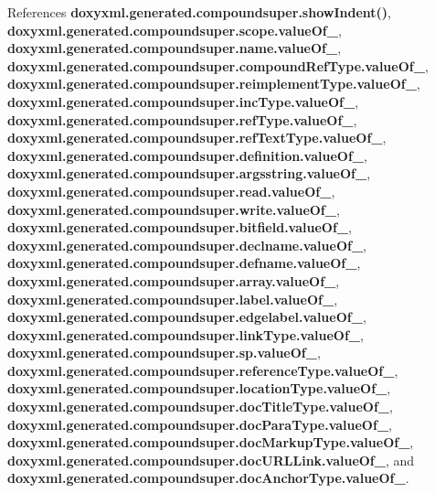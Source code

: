 References {\bf doxyxml.\+generated.\+compoundsuper.\+show\+Indent()}, {\bf doxyxml.\+generated.\+compoundsuper.\+scope.\+value\+Of\+\_\+}, {\bf doxyxml.\+generated.\+compoundsuper.\+name.\+value\+Of\+\_\+}, {\bf doxyxml.\+generated.\+compoundsuper.\+compound\+Ref\+Type.\+value\+Of\+\_\+}, {\bf doxyxml.\+generated.\+compoundsuper.\+reimplement\+Type.\+value\+Of\+\_\+}, {\bf doxyxml.\+generated.\+compoundsuper.\+inc\+Type.\+value\+Of\+\_\+}, {\bf doxyxml.\+generated.\+compoundsuper.\+ref\+Type.\+value\+Of\+\_\+}, {\bf doxyxml.\+generated.\+compoundsuper.\+ref\+Text\+Type.\+value\+Of\+\_\+}, {\bf doxyxml.\+generated.\+compoundsuper.\+definition.\+value\+Of\+\_\+}, {\bf doxyxml.\+generated.\+compoundsuper.\+argsstring.\+value\+Of\+\_\+}, {\bf doxyxml.\+generated.\+compoundsuper.\+read.\+value\+Of\+\_\+}, {\bf doxyxml.\+generated.\+compoundsuper.\+write.\+value\+Of\+\_\+}, {\bf doxyxml.\+generated.\+compoundsuper.\+bitfield.\+value\+Of\+\_\+}, {\bf doxyxml.\+generated.\+compoundsuper.\+declname.\+value\+Of\+\_\+}, {\bf doxyxml.\+generated.\+compoundsuper.\+defname.\+value\+Of\+\_\+}, {\bf doxyxml.\+generated.\+compoundsuper.\+array.\+value\+Of\+\_\+}, {\bf doxyxml.\+generated.\+compoundsuper.\+label.\+value\+Of\+\_\+}, {\bf doxyxml.\+generated.\+compoundsuper.\+edgelabel.\+value\+Of\+\_\+}, {\bf doxyxml.\+generated.\+compoundsuper.\+link\+Type.\+value\+Of\+\_\+}, {\bf doxyxml.\+generated.\+compoundsuper.\+sp.\+value\+Of\+\_\+}, {\bf doxyxml.\+generated.\+compoundsuper.\+reference\+Type.\+value\+Of\+\_\+}, {\bf doxyxml.\+generated.\+compoundsuper.\+location\+Type.\+value\+Of\+\_\+}, {\bf doxyxml.\+generated.\+compoundsuper.\+doc\+Title\+Type.\+value\+Of\+\_\+}, {\bf doxyxml.\+generated.\+compoundsuper.\+doc\+Para\+Type.\+value\+Of\+\_\+}, {\bf doxyxml.\+generated.\+compoundsuper.\+doc\+Markup\+Type.\+value\+Of\+\_\+}, {\bf doxyxml.\+generated.\+compoundsuper.\+doc\+U\+R\+L\+Link.\+value\+Of\+\_\+}, and {\bf doxyxml.\+generated.\+compoundsuper.\+doc\+Anchor\+Type.\+value\+Of\+\_\+}.



